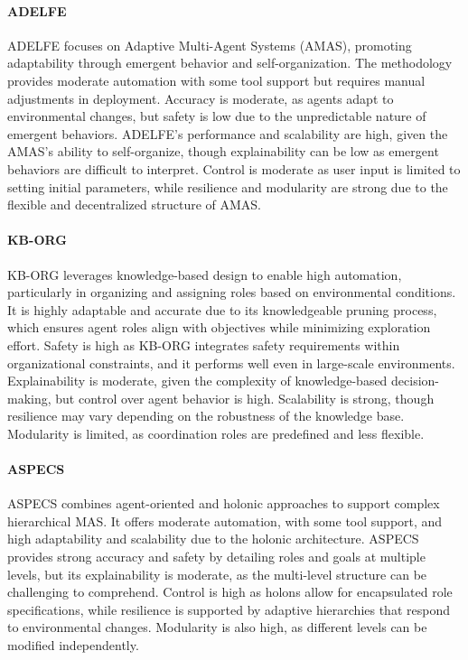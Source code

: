 \documentclass[sigconf,anonymous]{aamas}
\begin{document}
\paragraph{ADELFE}
ADELFE \cite{gleize2008adelfe} focuses on Adaptive Multi-Agent Systems (AMAS), promoting adaptability through emergent behavior and self-organization. The methodology provides moderate automation with some tool support but requires manual adjustments in deployment. Accuracy is moderate, as agents adapt to environmental changes, but safety is low due to the unpredictable nature of emergent behaviors. ADELFE’s performance and scalability are high, given the AMAS's ability to self-organize, though explainability can be low as emergent behaviors are difficult to interpret. Control is moderate as user input is limited to setting initial parameters, while resilience and modularity are strong due to the flexible and decentralized structure of AMAS.

\paragraph{KB-ORG}
KB-ORG \cite{corkill2008automated} leverages knowledge-based design to enable high automation, particularly in organizing and assigning roles based on environmental conditions. It is highly adaptable and accurate due to its knowledgeable pruning process, which ensures agent roles align with objectives while minimizing exploration effort. Safety is high as KB-ORG integrates safety requirements within organizational constraints, and it performs well even in large-scale environments. Explainability is moderate, given the complexity of knowledge-based decision-making, but control over agent behavior is high. Scalability is strong, though resilience may vary depending on the robustness of the knowledge base. Modularity is limited, as coordination roles are predefined and less flexible.

\paragraph{ASPECS}
ASPECS \cite{bernon2011aspecs} combines agent-oriented and holonic approaches to support complex hierarchical MAS. It offers moderate automation, with some tool support, and high adaptability and scalability due to the holonic architecture. ASPECS provides strong accuracy and safety by detailing roles and goals at multiple levels, but its explainability is moderate, as the multi-level structure can be challenging to comprehend. Control is high as holons allow for encapsulated role specifications, while resilience is supported by adaptive hierarchies that respond to environmental changes. Modularity is also high, as different levels can be modified independently.
\end{document}
